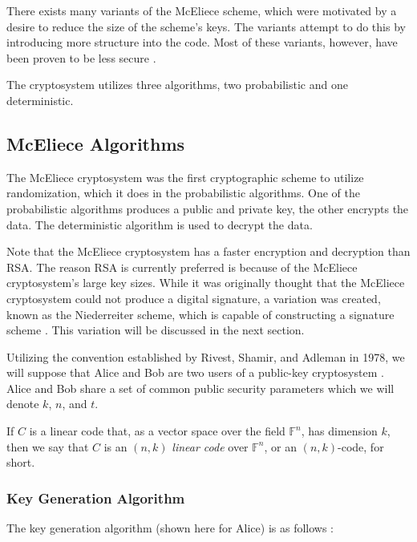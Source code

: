 There exists many variants of the McEliece scheme, which were motivated by a desire to reduce the size of the scheme's keys. The variants attempt to do this by introducing more structure into the code.  Most of these variants, however, have been proven to be less secure \cite{Overbeck2009}.

The cryptosystem utilizes three algorithms, two probabilistic and one deterministic. 

\subsection{McEliece Algorithms}\label{subsec:mceliecealgo}

The McEliece cryptosystem was the first cryptographic scheme to utilize randomization, which it does in the probabilistic algorithms. One of the probabilistic algorithms produces a public and private key, the other encrypts the data. The deterministic algorithm is used to decrypt the data.

Note that the McEliece cryptosystem has a faster encryption and decryption than RSA. The reason RSA is currently preferred is because of the McEliece cryptosystem's large key sizes. While it was originally thought that the McEliece cryptosystem could not produce a digital signature, a variation was created, known as the Niederreiter scheme, which is capable of constructing a signature scheme \cite{10.1007/3-540-45682-1_10}. This variation will be discussed in the next section.

Utilizing the convention established by Rivest, Shamir, and Adleman in 1978, we will suppose that Alice and Bob are two users of a public-key cryptosystem \cite{10.1145/359340.359342}. Alice and Bob share a set of common public security parameters which we will denote $k$, $n$, and $t$.

\begin{definition}
    If $C$ is a linear code that, as a vector space over the field $\mathbb{F}^n$, has dimension $k$, then we say that $C$ is an $(n, k)$ \textit{linear code} over $\mathbb{F}^n$, or an $(n, k)$-code, for short.
\end{definition}

\subsubsection{Key Generation Algorithm}

The key generation algorithm (shown here for Alice) is as follows \cite{1978DSNPR..44..114M}:

